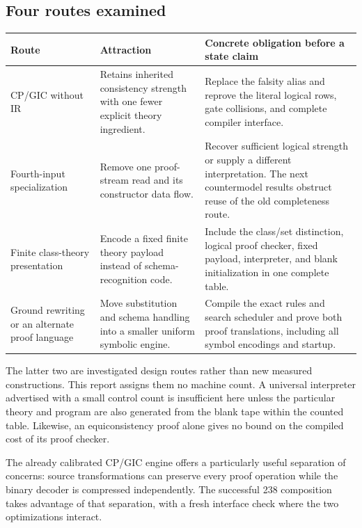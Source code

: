 \subsection{Four routes examined}

\begin{center}
\small
\begin{tabular}{p{}p{}p{}}
\toprule
Route&Attraction&Concrete obligation before a state claim\\
\midrule
CP/GIC without IR&Retains inherited consistency strength with one fewer
explicit theory ingredient.&Replace the falsity alias and reprove the
literal logical rows, gate collisions, and complete compiler interface.\\
Fourth-input specialization&Remove one proof-stream read and its
constructor data flow.&Recover sufficient logical strength or supply a
different interpretation. The next countermodel results obstruct reuse
of the old completeness route.\\
Finite class-theory presentation&Encode a fixed finite theory payload
instead of schema-recognition code.&Include the class/set distinction,
logical proof checker, fixed payload, interpreter, and blank initialization
in one complete table.\\
Ground rewriting or an alternate proof language&Move substitution and
schema handling into a smaller uniform symbolic engine.&Compile the exact
rules and search scheduler and prove both proof translations, including
all symbol encodings and startup.\\
\bottomrule
\end{tabular}
\end{center}

The latter two are investigated design routes rather than new measured
constructions. This report assigns them no machine count. A universal
interpreter advertised with a small control count is insufficient here
unless the particular theory and program are also generated from the
blank tape within the counted table. Likewise, an equiconsistency proof
alone gives no bound on the compiled cost of its proof checker.

The already calibrated CP/GIC engine offers a particularly useful
separation of concerns: source transformations can preserve every proof
operation while the binary decoder is compressed independently. The
successful 238 composition takes advantage of that separation, with a
fresh interface check where the two optimizations interact.

